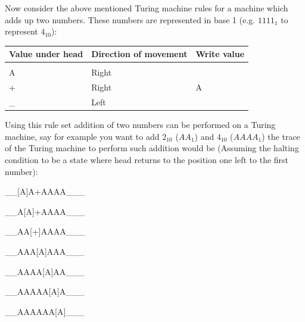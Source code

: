\documentclass[a4paper,10pt]{article}
\theoremstyle{mytheor}
\begin{document}
{    Now consider the above mentioned Turing machine rules for a
    machine which adds up two numbers. These numbers are represented
    in base 1 (e.g. $1111_1$ to represent $4_{10}$):
    \begin{table}
      \centering
      \renewcommand{\arraystretch}{1.1}
      \begin{tabularx}{0.8\textwidth}{|X|X|X|}
        \hline
        \rowcolor{greatblue}
        \color{white} Value under head & \color{white}Direction of movement & \color{white}Write value \\
        \hline
        \vspace{0.2cm}&&\\
        A  & Right &   \\
        +  & Right & A \\
        \_ & Left &   \\
        \hline
      \end{tabularx}
    \end{table}

    Using this rule set addition of two numbers can be performed on a
    Turing machine, say for example you want to add $2_{10}$ ($AA_1$)
    and $4_{10}$ ($AAAA_1$) the trace of the Turing machine to perform
    such addition would be (Assuming the halting condition to be a
    state where head returns to the position one left to the first
    number):
    \begin{legal}
    \item \begin{textsc}\_\_[A]A+AAAA\_\_\_\end{textsc}
    \item \begin{textsc}\_\_A[A]+AAAA\_\_\_\end{textsc}
    \item \begin{textsc}\_\_AA[+]AAAA\_\_\_\end{textsc}
    \item \begin{textsc}\_\_AAA[A]AAA\_\_\_\end{textsc}
    \item \begin{textsc}\_\_AAAA[A]AA\_\_\_\end{textsc}
    \item \begin{textsc}\_\_AAAAA[A]A\_\_\_\end{textsc}
    \item \begin{textsc}\_\_AAAAAA[A]\_\_\_\end{textsc}
      

\end{legal}}
\end{document}
